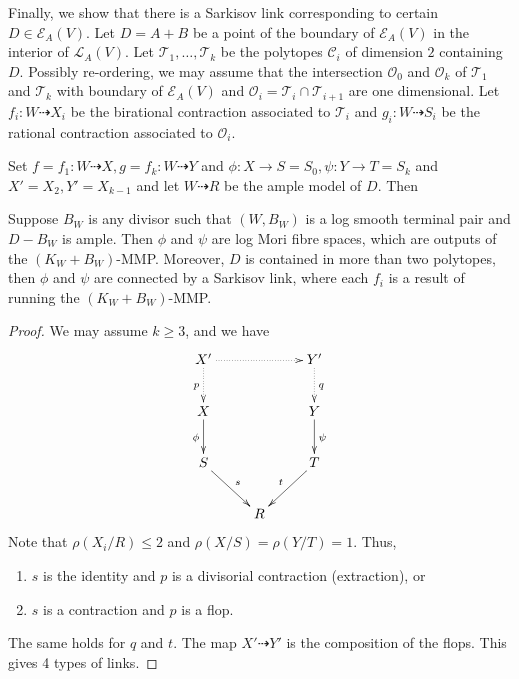 Finally, we show that there is a Sarkisov link corresponding to certain $D \in \mathcal{E}_{A}(V)$. Let $ D=A+B $ be a point of the boundary of $ \mathcal{E}_A(V) $ in the interior of $ \mathcal{L}_A(V) $. Let $ \mathcal{T}_1, \ldots, \mathcal{T}_k $ be the polytopes $ \mathcal{C}_i $ of dimension $ 2 $ containing $ D $. Possibly re-ordering, we may assume that  the intersection  $ \mathcal{O}_0 $ and $ \mathcal{O}_k $ of $ \mathcal{T}_1 $ and $ \mathcal{T}_k $ with boundary of $ \mathcal{E}_A(V) $ and  $ \mathcal{O}_i=\mathcal{T}_i\cap\mathcal{T}_{i+1} $ are one dimensional. Let $ f_i:W\dashrightarrow  X_i $ be the birational contraction associated to $ \mathcal{T}_i $ and $ g_i:W\dashrightarrow  S_i $ be the rational contraction associated to $ \mathcal{O}_i $.
\begin{center}
\end{center}

Set $ f=f_1:W\dashrightarrow X, g=f_k:W\dashrightarrow Y $ and $ \phi:X\to S=S_0,\psi:Y\to T=S_k $ and $ X'=X_2,Y'=X_{k-1} $ and let $ W\dashrightarrow R $ be the ample model of $ D $. Then
\begin{theorem}\label{constructlink}
  \cite[Theorem 3.7]{haconSarkisovProgram2012} Suppose $ B_W $ is any divisor such that $ (W,B_W) $ is a log smooth terminal pair and $ D-B_W $ is ample. Then $ \phi $ and $ \psi $ are log Mori fibre spaces, which are outputs of the $ (K_W+B_W) $-MMP. Moreover, $ D $ is contained in more than two polytopes, then $\phi$ and $\psi$ are connected by a Sarkisov link, where each $f_{i}$ is a result of running the $(K_{W}+B_{W})$-MMP.
\end{theorem}
\begin{proof}
  We may assume $ k\geqslant 3 $, and we have
  $$ \xymatrix{
      X'\ar@{.>}[d]_p\ar@{.>}[rr]&&Y'\ar@{.>}[d]^q\\
      X\ar[d]_{\phi}&&Y\ar[d]^\psi\\
      S\ar[rd]^s&&T\ar[ld]_t\\
      &R&} $$
  Note that $ \rho(X_i/R)\leqslant 2 $ and $ \rho(X/S)=\rho(Y/T)=1 $. Thus,
  \begin{enumerate}
    \item $ s $ is the identity and $ p $ is a divisorial contraction (extraction), or
    \item $ s $ is a contraction and $ p $ is a flop.
  \end{enumerate}
  The same holds for $ q $ and $ t $. The map $X'\dashrightarrow Y'$ is the composition of the flops. This gives 4 types of links.
\end{proof}

